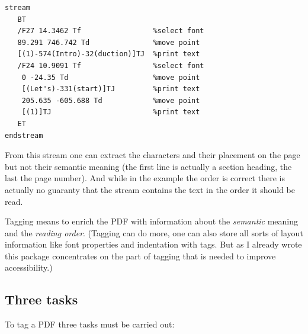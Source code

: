 \documentclass[DIV=12,parskip=half-,bibliography=totoc]{scrartcl}
\newcommand\PDF{PDF}
\begin{document}
\begin{lstlisting}[columns=fixed]
stream
   BT
   /F27 14.3462 Tf                 %select font
   89.291 746.742 Td               %move point
   [(1)-574(Intro)-32(duction)]TJ  %print text
   /F24 10.9091 Tf                 %select font
    0 -24.35 Td                    %move point
    [(Let's)-331(start)]TJ         %print text
    205.635 -605.688 Td            %move point
    [(1)]TJ                        %print text
   ET
endstream
\end{lstlisting}


From this stream one can extract the characters and their placement on the page but not their semantic meaning  (the first line is actually a section heading, the last the page number). And while in the example the order is correct there is actually no guaranty that the stream contains the text in the order it should be read.

Tagging means to enrich the \PDF{} with information about the \emph{semantic} meaning and the \emph{reading order}. (Tagging can do more, one can also store all sorts of layout information like font properties and indentation with tags. But as I already wrote this package concentrates on the part of tagging that is needed to improve accessibility.)




\subsection{Three tasks}



To tag a \PDF{} three tasks must be  carried out:
\end{document}
